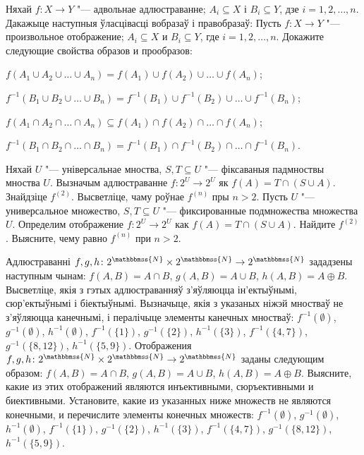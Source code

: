 




\begin{problemList}

\problemItemWithCommonPart
{Няхай $f \colon X \to Y$ "--- адвольнае адлюстраванне;
$A_i \subseteq X$ і $B_i \subseteq Y$, дзе $i = 1, 2, \ldots, n$.
Дакажыце наступныя ўласцівасці вобразаў і правобразаў:}
{Пусть $f \colon X \to Y$ "--- произвольное отображение;
$A_i \subseteq X$ и $B_i \subseteq Y$, где $i = 1, 2, \ldots, n$.
Докажите следующие свойства образов и прообразов:}
{%
\begin{belarusianEnumerate}
    \item $f(A_1 \cup A_2 \cup \ldots \cup A_n) = f(A_1) \cup f(A_2) \cup \ldots \cup f(A_n)$;
    \item $f^{-1}(B_1 \cup B_2 \cup \ldots \cup B_n) = f^{-1}(B_1) \cup f^{-1}(B_2) \cup \ldots \cup f^{-1}(B_n)$;
    \item $f(A_1 \cap A_2 \cap \ldots \cap A_n) \subseteq f(A_1) \cap f(A_2) \cap \ldots \cap f(A_n)$;
    \item $f^{-1}(B_1 \cap B_2 \cap \ldots \cap B_n) = f^{-1}(B_1) \cap f^{-1}(B_2) \cap \ldots \cap f^{-1}(B_n)$.
\end{belarusianEnumerate}
}

\smallskip

\problemItemSimple
{Няхай $U$ "--- універсальнае мноства, $S, T \subseteq U$ "--- фіксаваныя падмноствы мноства $U$.
Вызначым адлюстраванне $f \colon 2^U \to 2^U$ як $f(A) = T \cap (S \cup A)$. Знайдзіце $f^{(2)}$.
Высветліце, чаму роўнае $f^{(n)}$ пры $n > 2$.}
{Пусть $U$ "--- универсальное множество, $S, T \subseteq U$ "--- фиксированные подмножества множества $U$.
Определим отображение $f \colon 2^U \to 2^U$ как $f(A) = T \cap (S \cup A)$. Найдите $f^{(2)}$.
Выясните, чему равно $f^{(n)}$ при $n > 2$.}

\bigskip

\problemItemSimple
{%
Адлюстраванні $f, g, h \colon 2^{\mathbbmss{N}} \times 2^{\mathbbmss{N}} \to 2^{\mathbbmss{N}}$
зададзены наступным чынам: $f(A, B) = A \cap B$, $g(A, B) = A \cup B$, $h(A, B) = A \oplus B$.
Высветліце, якія з гэтых адлюстраванняў з'яўляюцца ін'ектыўнымі, сюр'ектыўнымі і біектыўнымі.
Вызначыце, якія з указаных ніжэй мностваў не з'яўляюцца канечнымі, і пералічыце элементы канечных мностваў:
$f^{-1}(\emptyset)$, $g^{-1}(\emptyset)$, $h^{-1}(\emptyset)$, $f^{-1}(\{1\})$,
$g^{-1}(\{2\})$, $h^{-1}(\{3\})$, $f^{-1}(\{4, 7\})$,
$g^{-1}(\{8, 12\})$, $h^{-1}(\{5, 9\})$.
}
{%
Отображения $f, g, h \colon 2^{\mathbbmss{N}} \times 2^{\mathbbmss{N}} \to 2^{\mathbbmss{N}}$
заданы следующим образом: $f(A, B) = A \cap B$, $g(A, B) = A \cup B$, $h(A, B) = A \oplus B$.
Выясните, какие из этих отображений являются инъективными, сюръективными и биективными.
Установите, какие из указанных ниже множеств не являются конечными, и перечислите элементы конечных множеств:
$f^{-1}(\emptyset)$, $g^{-1}(\emptyset)$, $h^{-1}(\emptyset)$, $f^{-1}(\{1\})$,
$g^{-1}(\{2\})$, $h^{-1}(\{3\})$, $f^{-1}(\{4, 7\})$,
$g^{-1}(\{8, 12\})$, $h^{-1}(\{5, 9\})$.
}


\end{problemList}
